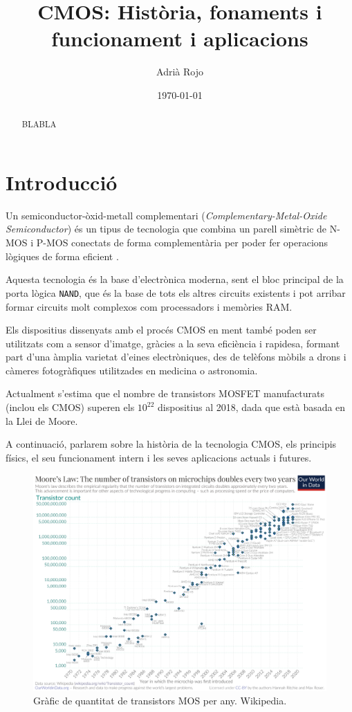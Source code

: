 \documentclass[11pt,a4paper]{article}
\title{\textbf{CMOS: Història, fonaments i funcionament i aplicacions}}
\author{Adrià Rojo}
\date{\today}
\begin{document}
\maketitle
\thispagestyle{empty}
\begin{abstract}
    BLABLA
\end{abstract}

\section{Introducció}

Un semiconductor-òxid-metall complementari (\textit{Complementary-Metal-Oxide Semiconductor}) és un tipus de tecnologia que combina un parell simètric de N-MOS i P-MOS conectats de forma complementària per poder fer operacions lògiques de forma eficient \autocite{wiki:CMOS}. 

Aquesta tecnologia és la base d'electrònica moderna, sent el bloc principal de la porta lògica \texttt{NAND}, que és la base de tots els altres circuits existents i pot arribar formar circuits molt complexos com processadors i memòries RAM.

Els dispositius dissenyats amb el procés CMOS en ment també poden ser utilitzats com a sensor d'imatge, gràcies a la seva eficiència i rapidesa, formant part d'una àmplia varietat d'eines electròniques, des de telèfons mòbils a drons i càmeres fotogràfiques utilitzades en medicina o astronomia. 

Actualment s'estima que el nombre de transistors MOSFET manufacturats (inclou els CMOS) superen els $10^{22}$ dispositius\autocite{wiki:Transistor_count} al 2018, dada que està basada en la Llei de Moore.

A continuació, parlarem sobre la història de la tecnologia CMOS, els principis físics, el seu funcionament intern i les seves aplicacions actuals i futures.

\begin{figure}[h]
    \centering
    \includegraphics[width=0.6\linewidth]{images/moore.png}
    \caption{Gràfic de quantitat de transistors MOS per any. Wikipedia.}
    \label{<label>}
\end{figure}
\end{document}
